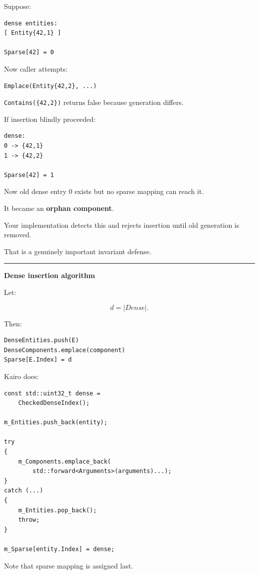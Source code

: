 Suppose:

\begin{verbatim}
dense entities:
[ Entity{42,1} ]

Sparse[42] = 0
\end{verbatim}

Now caller attempts:

\begin{verbatim}
Emplace(Entity{42,2}, ...)
\end{verbatim}

\texttt{Contains(\{42,2\})} returns false because generation differs.

If insertion blindly proceeded:

\begin{verbatim}
dense:
0 -> {42,1}
1 -> {42,2}

Sparse[42] = 1
\end{verbatim}

Now old dense entry 0 exists but no sparse mapping can reach it.

It became an \textbf{orphan component}.

Your implementation detects this and rejects insertion until old generation is removed.

That is a genuinely important invariant defense.

\begin{center}\rule{0.5\linewidth}{0.5pt}\end{center}

\textbf{Dense insertion algorithm}

Let:

\[
d=|Dense|.
\]

Then:

\begin{verbatim}
DenseEntities.push(E)
DenseComponents.emplace(component)
Sparse[E.Index] = d
\end{verbatim}

Kairo does:

\begin{verbatim}
const std::uint32_t dense =
    CheckedDenseIndex();

m_Entities.push_back(entity);

try
{
    m_Components.emplace_back(
        std::forward<Arguments>(arguments)...);
}
catch (...)
{
    m_Entities.pop_back();
    throw;
}

m_Sparse[entity.Index] = dense;
\end{verbatim}

Note that sparse mapping is assigned last.

